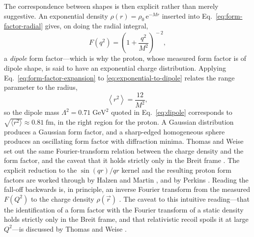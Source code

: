 The correspondence between shapes is then explicit rather than merely suggestive. An
exponential density $\rho(r) = \rho_{0}\,\mathrm{e}^{-Mr}$ inserted into
Eq.~\eqref{eq:form-factor-radial} gives, on doing the radial integral,
\begin{equation}
    F(q^{2}) = \left(1 + \frac{q^{2}}{M^{2}}\right)^{\!-2},
    \label{eq:exponential-to-dipole}
\end{equation}
a \emph{dipole} form factor---which is why the proton, whose measured form factor is of
dipole shape, is said to have an exponential charge distribution. Applying
Eq.~\eqref{eq:form-factor-expansion} to \eqref{eq:exponential-to-dipole} relates the
range parameter to the radius,
\begin{equation}
    \left\langle r^{2}\right\rangle = \frac{12}{M^{2}},
    \label{eq:r2-from-M}
\end{equation}
so the dipole mass $\Lambda^{2} = 0.71\;\mathrm{GeV}^{2}$ quoted in
Eq.~\eqref{eq:dipole} corresponds to $\sqrt{\langle r^{2}\rangle} \approx 0.81\;\mathrm{fm}$,
in the right region for the proton. A Gaussian distribution produces a Gaussian form
factor, and a sharp-edged homogeneous sphere produces an oscillating form factor with
diffraction minima. Thomas and Weise set out the same Fourier-transform relation between
the charge density and the form factor, and the caveat that it holds strictly only in the
Breit frame \cite[Ch.~2.2]{ThomasWeise2001}. The explicit reduction to the
$\sin(qr)/qr$ kernel and the resulting proton form factors are worked through by Halzen
and Martin \cite[Ch.~8]{HalzenMartin1984}, and by Perkins \cite[Ch.~5]{Perkins2000}. Reading the fall-off
backwards is, in principle, an inverse Fourier transform from the measured $F(Q^{2})$
to the charge density $\rho(\vec r)$ \cite[Ch.~1]{Amsler2018}. The caveat to this
intuitive reading---that the identification of a form factor with the Fourier transform
of a static density holds strictly only in the Breit frame, and that relativistic recoil
spoils it at large $Q^{2}$---is discussed by Thomas and Weise
\cite[Ch.~2.2]{ThomasWeise2001}.

